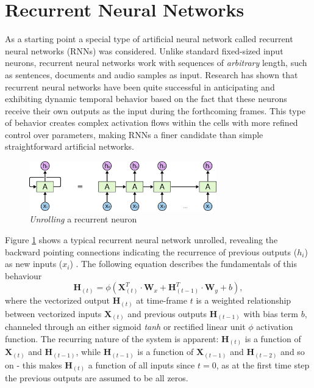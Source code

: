 \documentclass[conference]{IEEEtran}
\begin{document}
\section{Recurrent Neural Networks}
As a starting point a special type of artificial neural network called recurrent neural networks (RNNs) was considered. Unlike standard fixed-sized input neurons, recurrent neural networks work with sequences of \textit{arbitrary} length, such as sentences, documents and audio samples as input.
Research has shown that recurrent neural networks have been quite successful in anticipating and exhibiting dynamic temporal behavior \cite{magenta} based on the fact that these neurons receive their own outputs as the input during the forthcoming frames. 
This type of behavior creates complex activation flows within the cells with more refined control over parameters, making RNNs a finer candidate than simple straightforward artificial networks. 
\begin{figure}[h]
  \centering
  \includegraphics[width=3.2in]{Images/RNN-unrolled}
  \caption{\textit{Unrolling} a recurrent neuron}
  \label{unrolling}
\end{figure}
Figure \ref{unrolling} shows a typical recurrent neural network unrolled, revealing the backward pointing connections indicating the recurrence of previous outputs ($h_i$) as new inputs ($x_i$) \cite{colah}. The following equation describes the fundamentals of this behaviour
\begin{equation}
    \textbf{H}_{(t)} = \phi(\textbf{X}_{(t)}^T \cdot \textbf{W}_x  + \textbf{H}_{(t-1)}^T \cdot \textbf{W}_y +b),
\end{equation}
where the vectorized output $\textbf{H}_{(t)}$ at time-frame $t$ is a weighted relationship between vectorized inputs $\textbf{X}_{(t)}$ and previous outputs $\textbf{H}_{(t-1)}$ with bias term $b$, channeled through an either sigmoid \textit{tanh} or rectified linear unit $\phi$ activation function. The recurring nature of the system is apparent: $\textbf{H}_{(t)}$ is a function of $\textbf{X}_{(t)}$ and $\textbf{H}_{(t-1)}$, while $\textbf{H}_{(t-1)}$ is a function of $\textbf{X}_{(t-1)}$ and $\textbf{H}_{(t-2)}$ and so on - this makes $\textbf{H}_{(t)}$ a function of all inputs since $t=0$, as at the first time step the previous outputs are assumed to be all zeros. 
\end{document}
